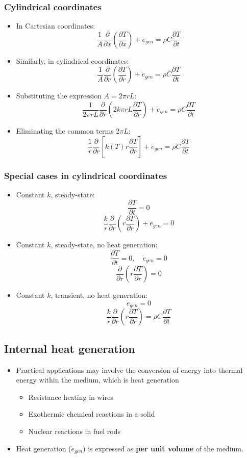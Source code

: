 \documentclass[11pt]{article}
\begin{document}
\subsubsection{Cylindrical coordinates}
\label{sec:orge8a2961}
\begin{itemize}
\item In Cartesian coordinates:
\[\frac{1}{A} \frac{\partial}{\partial x} \left(\frac{\partial T}{\partial x} \right) + \dot{e}_{gen} = \rho C \frac{\partial T}{\partial t}\]
\item Similarly, in cylindrical coordinates:
\[\frac{1}{A} \frac{\partial}{\partial r} \left(\frac{\partial T}{\partial r} \right) + \dot{e}_{gen} = \rho C \frac{\partial T}{\partial t}\]
\item Substituting the expression \(A = 2 \pi r L\):
\[\frac{1}{2 \pi r L} \frac{\partial}{\partial r} \left(2k \pi r L \frac{\partial T}{\partial r} \right) + \dot{e}_{gen} = \rho C \frac{\partial T}{\partial t}\]
\item Eliminating the common terms \(2 \pi L\):
\[\frac{1}{r} \frac{\partial}{\partial r} \left[k(T) r \frac{\partial T}{\partial r} \right] + \dot{e}_{gen} = \rho C \frac{\partial T}{\partial t}\]
\end{itemize}
\subsubsection{Special cases in cylindrical coordinates}
\label{sec:org6d089ff}
\begin{itemize}
\item Constant \(k\), steady-state:
\[\frac{\partial T}{\partial t} = 0\]
\[\frac{k}{r} \frac{\partial}{\partial r} \left(r \frac{\partial T}{\partial r} \right) + \dot{e}_{gen} = 0\]
\item Constant \(k\), steady-state, no heat generation:
\[\frac{\partial T}{\partial t} = 0, \quad \dot{e}_{gen} = 0\]
\[\frac{\partial}{\partial r} \left(r \frac{\partial T}{\partial r} \right) = 0\]
\item Constant \(k\), transient, no heat generation:
\[\dot{e}_{gen} = 0\]
\[\frac{k}{r} \frac{\partial}{\partial r} \left(r \frac{\partial T}{\partial r} \right) = \rho C \frac{\partial T}{\partial t}\]
\end{itemize}
\subsection{Internal heat generation}
\label{sec:org7bc7fed}
\begin{itemize}
\item Practical applications may involve the conversion of energy into thermal energy within the medium, which is heat generation
\begin{itemize}
\item Resistance heating in wires
\item Exothermic chemical reactions in a solid
\item Nuclear reactions in fuel rods
\end{itemize}
\item Heat generation (\(\dot{e}_{gen}\)) is expressed as \textbf{per unit volume} of the medium.
\end{itemize}
\end{document}
